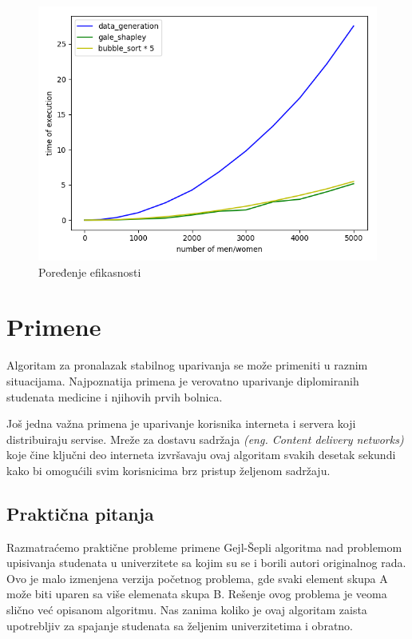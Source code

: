 \documentclass[a4paper]{article}
\begin{document}
\begin{figure}
	\centering
	\includegraphics[scale=0.5]{resources/execution_comparison.png}
	\caption{Poređenje efikasnosti}
	\label{fig1}
\end{figure}
\section{Primene}

Algoritam za pronalazak stabilnog uparivanja se može primeniti u raznim situacijama. Najpoznatija primena je verovatno uparivanje diplomiranih studenata medicine i njihovih prvih bolnica. 

Još jedna važna primena je uparivanje korisnika interneta i servera koji distribuiraju servise. Mreže za dostavu sadržaja \textit{(eng. Content delivery networks)} koje čine ključni deo interneta izvršavaju ovaj algoritam svakih desetak sekundi kako bi omogućili svim korisnicima brz pristup željenom sadržaju.

\subsection{Praktična pitanja}
Razmatraćemo praktične probleme primene Gejl-Šepli algoritma nad problemom upisivanja studenata u univerzitete sa kojim su se i borili autori originalnog rada. Ovo je malo izmenjena verzija početnog problema, gde svaki element skupa A može biti uparen sa više elemenata skupa B. Rešenje ovog problema je veoma slično već opisanom algoritmu. Nas zanima koliko je ovaj algoritam zaista upotrebljiv za spajanje studenata sa željenim univerzitetima i obratno.
\end{document}
